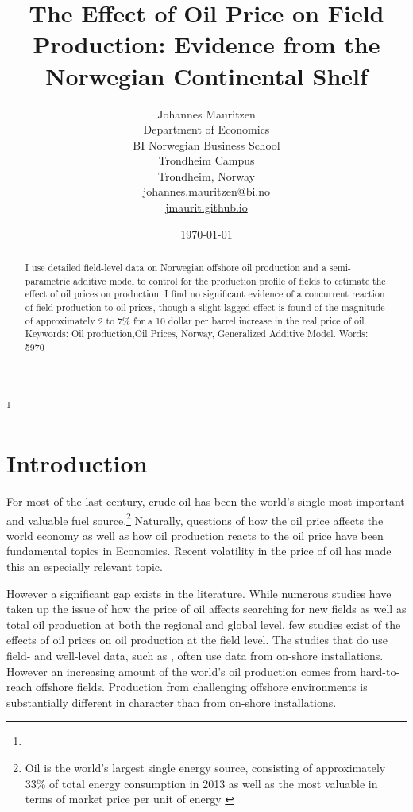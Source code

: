 \documentclass[12pt]{article}
\title{The Effect of Oil Price on Field Production: Evidence from the Norwegian Continental Shelf}
\author{Johannes Mauritzen\\
		Department of Economics\\
        BI Norwegian Business School\\
        Trondheim Campus\\
		Trondheim, Norway\\
        johannes.mauritzen@bi.no\\
        \url{jmaurit.github.io}\\
		}
\date{\today}
\begin{document}
 \begin{spacing}{1} %
	\maketitle

\begin{abstract}
I use detailed field-level data on Norwegian offshore oil production and a semi-parametric additive model to control for the production profile of fields to estimate the effect of oil prices on production.  I find no significant evidence of a concurrent reaction of field production to oil prices, though a slight lagged effect is found of the magnitude of approximately 2 to 7\% for a 10 dollar per barrel increase in the real price of oil.\\
Keywords: Oil production,Oil Prices, Norway, Generalized Additive Model.
Words: 5970
\end{abstract}

\thanks{}
 \end{spacing}

\section{Introduction}

For most of the last century, crude oil has been the world's single most important and valuable fuel source.\footnote{Oil is the world's largest single energy source, consisting of approximately 33\% of total energy consumption in 2013 as well as the most valuable in terms of market price per unit of energy \citep{british_petroleum_statistical_2013}} Naturally, questions of how the oil price affects the world economy as well as how oil production reacts to the oil price have been fundamental topics in Economics. Recent volatility in the price of oil has made this an especially relevant topic. 

However a significant gap exists in the literature.  While numerous studies have taken up the issue of how the price of oil affects searching for new fields as well as total oil production at both the regional and global level, few studies exist of the effects of oil prices on oil production at the field level.  The studies that do use field- and well-level data, such as \citet{rao_taxation_2010}, often use data from on-shore installations.  However an increasing amount of the world's oil production comes from hard-to-reach offshore fields.  Production from challenging offshore environments is substantially different in character than from on-shore installations.
\end{document}
